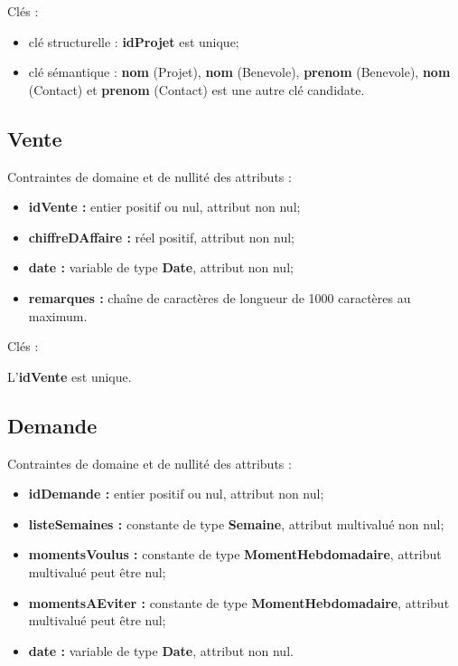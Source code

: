 \documentclass[asi, sansVersion]{picInsa}
\begin{document}
Clés : 
\begin{itemize}
\item clé structurelle : \textbf{idProjet} est unique;
\item clé sémantique : \textbf{nom} (Projet), \textbf{nom} (Benevole), \textbf{prenom} (Benevole), \textbf{nom} (Contact) et \textbf{prenom} (Contact) est une autre clé candidate. \\ 
\end{itemize}

\subsection*{Vente}
Contraintes de domaine et de nullité des attributs :
\begin{itemize}
 	\item \textbf{idVente :} entier positif ou nul, attribut non nul;
	\item \textbf{chiffreDAffaire :} réel positif, attribut non nul;
	\item \textbf{date :} variable de type \textbf{Date}, attribut non nul;
	\item \textbf{remarques :} chaîne de caractères de longueur de 1000 caractères au maximum. \\  
\end{itemize} 

Clés : 

L'\textbf{idVente} est unique.\\

\subsection*{Demande}
Contraintes de domaine et de nullité des attributs :
\begin{itemize}
	\item \textbf{idDemande :} entier positif ou nul, attribut non nul;
 	\item \textbf{listeSemaines :} constante de type \textbf{Semaine}, attribut multivalué non nul; 
	\item \textbf{momentsVoulus :} constante de type \textbf{MomentHebdomadaire}, attribut multivalué peut être nul;
	\item \textbf{momentsAEviter :} constante de type \textbf{MomentHebdomadaire}, attribut multivalué peut être nul;
	\item \textbf{date :} variable de type \textbf{Date}, attribut non nul.\\
\end{itemize} 
\end{document}
